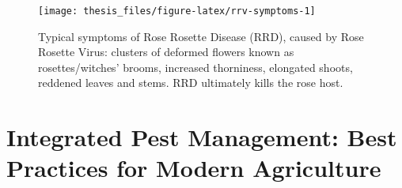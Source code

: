 \documentclass{ufdissertation}[overrideChapters] %
\begin{document}
{\begin{figure}
{\centering \texttt{[image: thesis\_files/figure-latex/rrv-symptoms-1]} 

}

\caption[Typical symptoms of Rose Rosette Disease (RRD), caused by Rose Rosette Virus]{Typical symptoms of Rose Rosette Disease (RRD), caused by Rose Rosette Virus: clusters of deformed flowers known as rosettes/witches' brooms, increased thorniness, elongated shoots, reddened leaves and stems. RRD ultimately kills the rose host.}\label{fig:rrv-symptoms}
\end{figure}
\hypertarget{integrated-pest-management-best-practices-for-modern-agriculture}{%
\section{Integrated Pest Management: Best Practices for Modern Agriculture}\label{integrated-pest-management-best-practices-for-modern-agriculture}}

}
\end{document}
